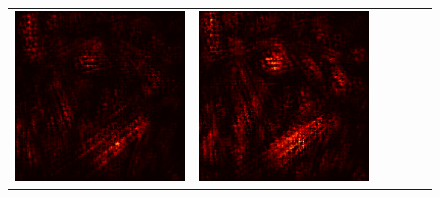\documentclass[preprint,12pt]{elsarticle}
\begin{document}
\begin{figure}[p]
\begin{tabular}{cccccc}
  \includegraphics[scale=\scale]{../visualizations/examples/imagenette/cnn/positive_saliency_map/2.png} & 
  \includegraphics[scale=\scale]{../visualizations/examples/imagenette/cnn/negative_saliency_map/2.png} & 

\end{tabular}
\end{figure}
\end{document}
